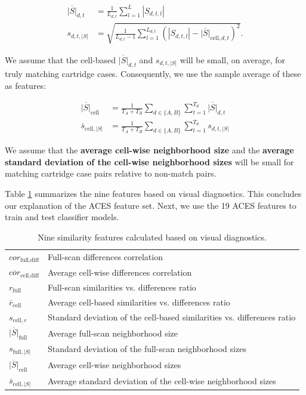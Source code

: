 \documentclass[11pt,]{isuthesis}
\begin{document}
\begin{align*}
\overline{|S|}_{d,t} &= \frac{1}{L_{d,t}} \sum_{l=1}^L |S_{d,t,l}| \\
s_{d,t,|S|} &= \sqrt{\frac{1}{L_{d,t} - 1} \sum_{l=1}^{L_{d,t}} (|S_{d,t,l}| - \overline{|S|}_{\text{cell},d,t})^2}.
\end{align*}

We assume that the cell-based \(\overline{|S|}_{d,t}\) and \(s_{d,t,|S|}\) will be small, on average, for truly matching cartridge cases.
Consequently, we use the sample average of these as features:

\begin{align*}
\overline{|S|}_{\text{cell}} &= \frac{1}{T_A + T_B} \sum_{d \in \{A,B\}} \sum_{t=1}^{T_d} \overline{|S|}_{d,t} \\
\bar{s}_{\text{cell},|S|} &= \frac{1}{T_A + T_B} \sum_{d \in \{A,B\}} \sum_{t=1}^{T_d} s_{d,t,|S|}
\end{align*}

We assume that the \textbf{average cell-wise neighborhood size} and the \textbf{average standard deviation of the cell-wise neighborhood sizes} will be small for matching cartridge case pairs relative to non-match pairs.

Table \ref{tab:visualDiagnosticFeatures} summarizes the nine features based on visual diagnostics.
This concludes our explanation of the ACES feature set.
Next, we use the 19 ACES features to train and test classifier models.

\begin{table}[htbp]
\centering
\begin{tabular}{p{.11\linewidth} p{.7\linewidth}}
$cor_{\text{full},\text{diff}}$ & Full-scan differences correlation \\
$\overline{cor}_{\text{cell},\text{diff}}$ & Average cell-wise differences correlation \\
$r_{\text{full}}$ & Full-scan similarities vs. differences ratio \\
$\bar{r}_{\text{cell}}$ & Average cell-based similarities vs. differences ratio \\
$s_{\text{cell}, r}$ & Standard deviation of the cell-based similarities vs. differences ratio \\
$\overline{|S|}_{\text{full}}$ & Average full-scan neighborhood size \\
$s_{\text{full},|S|}$ & Standard deviation of the full-scan neighborhood sizes \\
$\overline{|S|}_{\text{cell}}$ & Average cell-wise neighborhood sizes \\
$\bar{s}_{\text{cell},|S|}$ & Average standard deviation of the cell-wise neighborhood sizes
\end{tabular}
\caption{Nine similarity features calculated based on visual diagnostics.}
\label{tab:visualDiagnosticFeatures}
\end{table}
\end{document}
